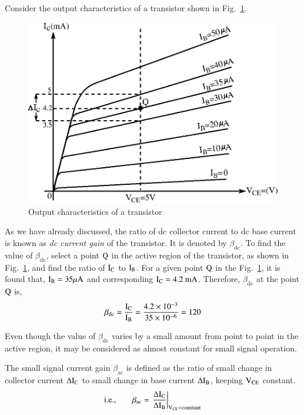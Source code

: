 Consider the output characteristics of a transistor shown in Fig.~\ref{fig2.19}.
\begin{figure}[H]
\centering
\includegraphics{chap2/fig19.eps}
\caption{Output characteristics of a transistor}\label{fig2.19}
\end{figure}

As we have already discussed, the ratio of dc collector current to dc base current is known as {\em dc current gain} of the transistor. It is denoted by $\beta_{\text{dc}}$. To find the value of $\beta_{\text{dc}}$, select a point $\textrm{Q}$ in the active region of the transistor, as shown in Fig.~\ref{fig2.19}, and find the ratio of $\textrm{I}_{\textrm{C}}$ to $\textrm{I}_{\textrm{B}}$. For a given point $\textrm{Q}$ in the Fig.~\ref{fig2.19}, it is found that, $\textrm{I}_{\textrm{B}}=35\mu\textrm{A}$ and corresponding $\textrm{I}_{\textrm{C}}=4.2\text{~mA}$. Therefore, $\beta_{\text{dc}}$ at the point $\textrm{Q}$ is,
$$
\beta_{\text{dc}}=\dfrac{\textrm{I}_{\textrm{C}}}{\textrm{I}_{\textrm{B}}}=\dfrac{4.2\times 10^{-3}}{35\times 10^{-6}}=120
$$

Even though the value of $\beta_{\text{dc}}$ varies by a small amount from point to point in the active region, it may be considered as almost constant for small signal operation.

The small signal current gain $\beta_{\text{ac}}$ is defined as the ratio of small change in collector current $\Delta \textrm{I}_{\textrm{C}}$ to small change in base current $\Delta\textrm{I}_{\textrm{B}}$, keeping $\textrm{V}_{\text{CE}}$ constant.
\begin{equation}
\text{i.e.,}\qquad \beta_{\text{ac}}=\left.\dfrac{\Delta \textrm{I}_{\textrm{C}}}{\Delta \textrm{I}_{\textrm{B}}}\right|_{\textrm{V}_{\text{CE}}=\text{constant}}\label{eq2.26}
\end{equation}

